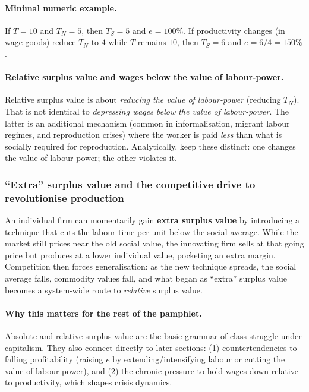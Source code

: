 \paragraph{Minimal numeric example.}
If $T=10$ and $T_N=5$, then $T_S=5$ and $e=100\%$.
If productivity changes (in wage-goods) reduce $T_N$ to $4$ while $T$ remains $10$,
then $T_S=6$ and $e=6/4=150\%$.

\paragraph{Relative surplus value and wages below the value of labour-power.}
Relative surplus value is about \emph{reducing the value of labour-power} (reducing $T_N$).
That is not identical to \emph{depressing wages below the value of labour-power}.
The latter is an additional mechanism (common in informalisation, migrant labour regimes, and
reproduction crises) where the worker is paid \emph{less} than what is socially required for reproduction.
Analytically, keep these distinct: one changes the value of labour-power; the other violates it.

\subsubsection*{“Extra” surplus value and the competitive drive to revolutionise production}

An individual firm can momentarily gain \textbf{extra surplus value} by introducing a technique that
cuts the labour-time per unit below the social average. While the market still prices near the old
social value, the innovating firm sells at that going price but produces at a lower individual value,
pocketing an extra margin. Competition then forces generalisation: as the new technique spreads,
the social average falls, commodity values fall, and what began as “extra” surplus value becomes a
system-wide route to \emph{relative} surplus value.

\paragraph{Why this matters for the rest of the pamphlet.}
Absolute and relative surplus value are the basic grammar of class
struggle under capitalism. They also connect directly to later sections:
(1) countertendencies to falling profitability (raising $e$ by extending/intensifying labour or cutting
the value of labour-power), and
(2) the chronic pressure to hold wages down relative to productivity, which shapes crisis dynamics.


